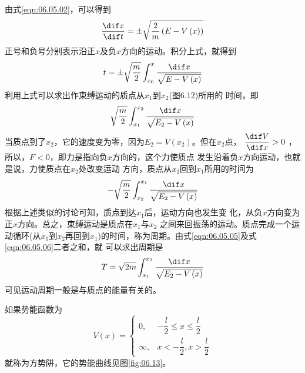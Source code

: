 \documentclass[../outline-of-mechanics.tex]{subfiles}
\begin{document}
由式\eqref{eqn:06.05.02}，可以得到
\begin{equation*}
  \frac { \dif x } { \dif t } = \pm \sqrt { \frac { 2 } { m } \left( E - V \left( x \right) \right) }
\end{equation*}
正号和负号分别表示沿正$ x $及负$ x $方向的运动。积分上式，就得到
\begin{equation}\label{eqn:06.05.04}
  t = \pm \sqrt { \frac { m } { 2 } } \int _ { x _ { 0 } } ^ { x } \frac { \dif x } { \sqrt { E - V \left( x \right) } }
\end{equation}
利用上式可以求出作束缚运动的质点从$ x_1 $到$ x_2 $(图6.12)所用的
时间，即
\begin{equation}\label{eqn:06.05.05}
  \sqrt { \frac { m } { 2 } } \int _ { x _ { 1 } } ^ { x _ { 2 } } \frac { \dif x } { \sqrt { E _ { 2 } - V \left( x \right) } }
\end{equation}
当质点到了$ x_2 $，它的速度变为零，因为$ E _ { 2 } = V \left( x _ { 2 } \right) $。但在$ x_2 $点，
$ \dfrac { \dif V } { \dif x } > 0 $
，所以，$ F < 0 $，即力是指向负$ x $方向的，这个力使质点
发生沿着负$ x $方向运动，也就是说，力使质点在$ x_2 $处改变运动
方向，质点从$ x_2 $回到$ x_1 $所用的时间为
\begin{equation}\label{eqn:06.05.06}
  - \sqrt { \frac { m } { 2 } } \int _ { x _ { 2 } } ^ { x _ { 1 } } \frac { \dif x } { \sqrt { E _ { 2 } - V \left( x \right) } }
\end{equation}
根据上述类似的讨论可知，质点到达$ x_1 $后，运动方向也发生变
化，从负$ x $方向变为正$ x $方向。总之，束缚运动是质点在$ x_1 $与$ x_2 $
之间来回振荡的运动。质点完成一个运动循环(从$ x_1 $到$ x_2 $再回到$
  x _ { 1 } $)的时间，称为周期。由式\eqref{eqn:06.05.05}及式\eqref{eqn:06.05.06}二者之和，就
可以求出周期是
\begin{equation}\label{eqn:06.05.07}
  T = \sqrt { 2 m } \int _ { x _ { 1 } } ^ { x _ { 2 } } \frac { \dif x } { \sqrt { { E _ { 2 } - V \left( x \right) } } }
\end{equation}
可见运动周期一般是与质点的能量有关的。

\example 如果势能函数为
\begin{equation*}
  V \left( x \right) = \begin{cases}
    0,      & - \dfrac { l }{ 2 } \leqslant x \leqslant \dfrac { l } { 2 } \\
    \infty, & x < - \dfrac { l } { 2 }, x > \dfrac { l } { 2 }
  \end{cases}
\end{equation*}
就称为方势阱，它的势能曲线见图\ref{fig:06.13}。
\end{document}
